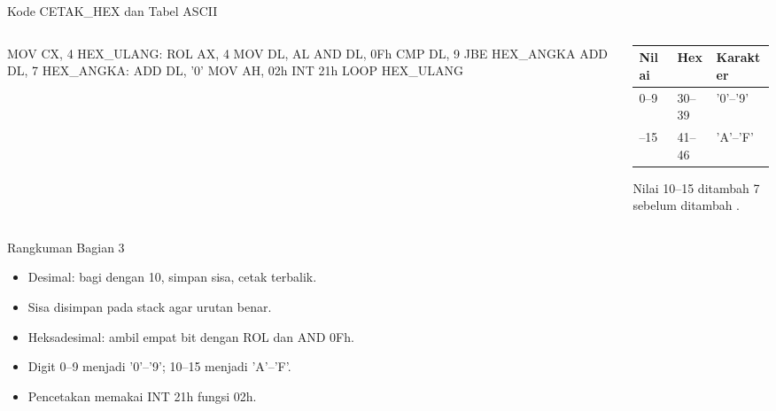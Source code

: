 \documentclass[aspectratio=169,11pt]{beamer}
\begin{document}
\begin{frame}[fragile]{Kode CETAK\_HEX dan Tabel ASCII}
\begin{columns}[t]
\begin{column}{0.55\textwidth}
\begin{kodeasm}
MOV CX, 4
HEX_ULANG:
    ROL AX, 4
    MOV DL, AL
    AND DL, 0Fh
    CMP DL, 9
    JBE HEX_ANGKA
    ADD DL, 7
HEX_ANGKA:
    ADD DL, '0'
    MOV AH, 02h
    INT 21h
    LOOP HEX_ULANG
\end{kodeasm}
\end{column}
\begin{column}{0.42\textwidth}
\footnotesize
\begin{tabular}{@{}p{1.4cm}p{1.6cm}p{1.6cm}@{}}
    \toprule
    \textbf{Nilai} & \textbf{Hex} & \textbf{Karakter} \\
    \midrule
    0--9 & 30--39 & '0'--'9' \\
    \addlinespace
    10--15 & 41--46 & 'A'--'F' \\
    \bottomrule
\end{tabular}

\vspace{0.3em}
{\color{obeGray}Nilai 10--15 ditambah 7 sebelum ditambah
.\par}
\end{column}
\end{columns}
\end{frame}

\begin{frame}{Rangkuman Bagian 3}
\small
\begin{itemize}
    \item Desimal: bagi dengan 10, simpan sisa, cetak terbalik.

    \vspace{0.15em}
    \item Sisa disimpan pada stack agar urutan benar.

    \vspace{0.15em}
    \item Heksadesimal: ambil empat bit dengan ROL dan AND 0Fh.

    \vspace{0.15em}
    \item Digit 0--9 menjadi '0'--'9'; 10--15 menjadi 'A'--'F'.

    \vspace{0.15em}
    \item Pencetakan memakai INT 21h fungsi 02h.
\end{itemize}
\end{frame}
\end{document}
